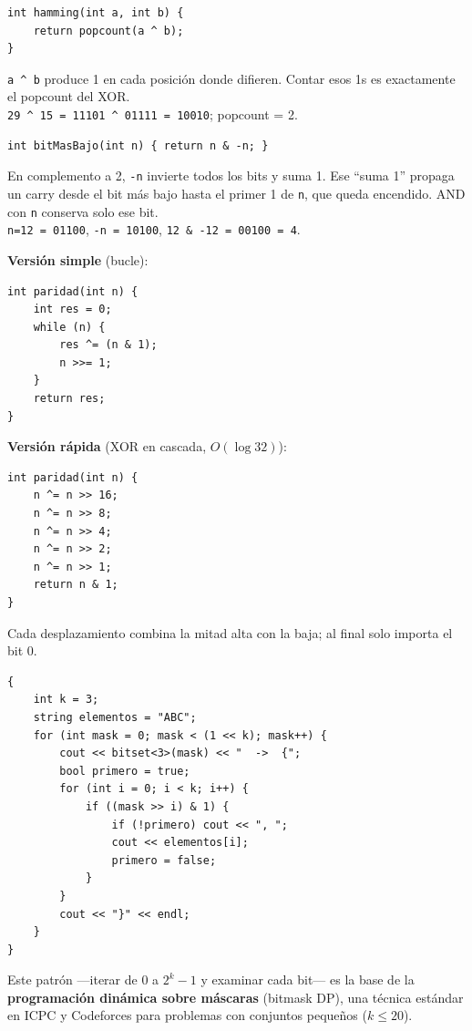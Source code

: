 \documentclass[12pt, oneside]{article}
\begin{document}
\begin{notaprofesor}
\begin{verbatim}
int hamming(int a, int b) {
    return popcount(a ^ b);
}
\end{verbatim}
  \texttt{a \textasciicircum{} b} produce 1 en cada posición donde difieren.
  Contar esos 1s es exactamente el popcount del XOR.\\[4pt]
  \texttt{29 \textasciicircum{} 15 = 11101 \textasciicircum{} 01111 = 10010};
  popcount = 2. \checkmark
\end{notaprofesor}

\begin{notaprofesor}
\begin{verbatim}
int bitMasBajo(int n) { return n & -n; }
\end{verbatim}
  En complemento a 2, \texttt{-n} invierte todos los bits y suma 1.
  Ese ``suma 1'' propaga un carry desde el bit más bajo hasta el primer
  1 de \texttt{n}, que queda encendido. AND con \texttt{n} conserva
  solo ese bit.\\[4pt]
  \texttt{n=12 = 01100}, \texttt{-n = 10100}, \texttt{12 \& -12 = 00100 = 4}. \checkmark
\end{notaprofesor}

\begin{notaprofesor}
  \textbf{Versión simple} (bucle):
\begin{verbatim}
int paridad(int n) {
    int res = 0;
    while (n) {
        res ^= (n & 1);
        n >>= 1;
    }
    return res;
}
\end{verbatim}

  \textbf{Versión rápida} (XOR en cascada, $O(\log 32)$):
\begin{verbatim}
int paridad(int n) {
    n ^= n >> 16;
    n ^= n >> 8;
    n ^= n >> 4;
    n ^= n >> 2;
    n ^= n >> 1;
    return n & 1;
}
\end{verbatim}
  Cada desplazamiento combina la mitad alta con la baja; al final solo
  importa el bit 0.
\end{notaprofesor}

\begin{notaprofesor}
\begin{verbatim}
{
    int k = 3;
    string elementos = "ABC";
    for (int mask = 0; mask < (1 << k); mask++) {
        cout << bitset<3>(mask) << "  ->  {";
        bool primero = true;
        for (int i = 0; i < k; i++) {
            if ((mask >> i) & 1) {
                if (!primero) cout << ", ";
                cout << elementos[i];
                primero = false;
            }
        }
        cout << "}" << endl;
    }
}
\end{verbatim}
  Este patrón —iterar de 0 a $2^k - 1$ y examinar cada bit— es la base
  de la \textbf{programación dinámica sobre máscaras} (bitmask DP), una
  técnica estándar en ICPC y Codeforces para problemas con conjuntos
  pequeños ($k \leq 20$).
\end{notaprofesor}
\end{document}

